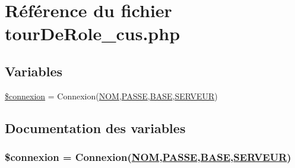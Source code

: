 \hypertarget{tourDeRole__cus_8php}{
\section{R\'{e}f\'{e}rence du fichier tour\-De\-Role\_\-cus.php}
\label{tourDeRole__cus_8php}
}
\subsection*{Variables}
\begin{CompactItemize}
\item 
\hyperlink{tourDeRole__cus_8php_a0}{\$connexion} = Connexion(\hyperlink{pma__connect_8php_a0}{NOM},\hyperlink{pma__connect_8php_a1}{PASSE},\hyperlink{pma__connect_8php_a3}{BASE},\hyperlink{pma__connect_8php_a2}{SERVEUR})
\end{CompactItemize}


\subsection{Documentation des variables}
\hypertarget{tourDeRole__cus_8php_a0}{
\subsubsection[\$connexion]{\setlength{\rightskip}{0pt plus 5cm}\$connexion = Connexion(\hyperlink{pma__connect_8php_a0}{NOM},\hyperlink{pma__connect_8php_a1}{PASSE},\hyperlink{pma__connect_8php_a3}{BASE},\hyperlink{pma__connect_8php_a2}{SERVEUR})}}
\label{tourDeRole__cus_8php_a0}


